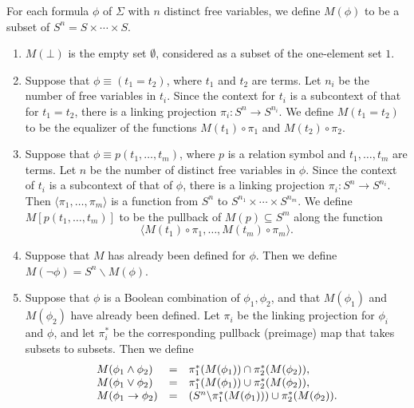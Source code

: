 \begin{defn} For each formula $\phi$ of $\Sigma$ with $n$ distinct
  free variables, we define $M(\phi )$ to be a subset of
  $S^n=S\times \cdots\times S$.
\begin{enumerate}
\item $M(\bot )$ is the empty set $\emptyset$, considered as a subset
  of the one-element set $1$.
\item Suppose that $\phi\equiv (t_1=t_2)$, where $t_1$ and $t_2$ are
  terms.  Let $n_i$ be the number of free variables in $t_i$.  Since
  the context for $t_i$ is a subcontext of that for $t_1=t_2$, there
  is a linking projection $\pi _i:S^n\to S^{n_i}$.  We define
  $M(t_1=t_2)$ to be the equalizer of the functions
  $M(t_1)\circ \pi _1$ and $M(t_2)\circ \pi _2$.
  
\item Suppose that $\phi\equiv p(t_1,\dots ,t_m)$, where $p$ is a
  relation symbol and $t_1,\dots ,t_m$ are terms.  Let $n$ be the
  number of distinct free variables in $\phi$.  Since the context of
  $t_i$ is a subcontext of that of $\phi$, there is a linking
  projection $\pi _i:S^n\to S^{n_i}$.  Then
  $\langle \pi _1,\dots ,\pi _m\rangle$ is a function from $S^n$ to
  $S^{n_1}\times\cdots\times S^{n_m}$.  We define
  $M[p(t_1,\dots ,t_m)]$ to be the pullback of $M(p)\subseteq S^m$
  along the function
  \[ \langle M(t_1)\circ \pi _1,\dots ,M(t_m)\circ \pi _m\rangle .\]
\item Suppose that $M$ has already been defined for $\phi$.  Then we
  define $M(\neg \phi )=S^n\backslash M(\phi )$.   
\item Suppose that $\phi$ is a Boolean combination of
  $\phi _1,\phi _2$, and that $M(\phi _1)$ and $M(\phi _2)$ have
  already been defined.  Let $\pi _i$ be the linking projection for
  $\phi _i$ and $\phi$, and let $\pi _i^*$ be the corresponding
  pullback (preimage) map that takes subsets to subsets.  Then we define
  \[ \begin{array}{l l l} M(\phi _1\wedge\phi _2 ) & = & \pi
      _1^*(M(\phi
                                                         _1))\cap \pi _2^*(M(\phi _2)) ,    \\
       M(\phi _1\vee\phi _2) & = & \pi _1^*(M(\phi _1))\cup \pi
                                   _2^*(M(\phi
                                   _2)) , \\
       M(\phi _1\to \phi _2) & = & (S^n\backslash \pi _1^*(M(\phi
                                   _1)))\cup \pi _2^*(M(\phi _2)) . \end{array} \]


\end{enumerate}
\end{defn}
